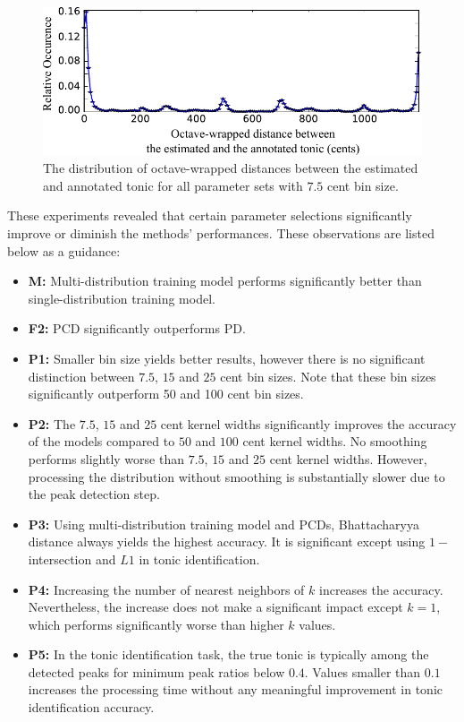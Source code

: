 \documentclass{sig-alternate}
\begin{document}
\begin{figure}
\centering
\includegraphics[width=.8\columnwidth]{figures/tonic_deviation_distribution}
\caption{The distribution of octave-wrapped distances between the estimated and annotated tonic for all parameter sets with $7.5$ cent bin size.}
\label{fig:tonic_distribution}
\end{figure}

These experiments revealed that certain parameter selections significantly improve or diminish the methods' performances. These observations are listed below as a guidance:

\begin{itemize}[noitemsep]
\item \textbf{M:} Multi-distribution training model performs significantly better than single-distribution training model.
\item \textbf{F2:} PCD significantly outperforms PD.
\item \textbf{P1:} Smaller bin size yields better results, however there is no significant distinction between $7.5$, $15$ and $25$ cent bin sizes. Note that these bin sizes significantly outperform 50 and 100 cent bin sizes.
\item \textbf{P2:} The $7.5$, $15$ and $25$ cent kernel widths significantly improves the accuracy of the models compared to $50$ and $100$ cent kernel widths. No smoothing performs slightly worse than $7.5$, $15$ and $25$ cent kernel widths. However, processing the distribution without smoothing is substantially slower due to the peak detection step.
\item \textbf{P3:} Using multi-distribution training model and PCDs, Bhattacharyya distance always yields the highest accuracy. It is significant except using $1-$intersection and $L1$ in tonic identification.
\item \textbf{P4:} Increasing the number of nearest neighbors of $k$ increases the accuracy. Nevertheless, the increase does not make a significant impact except $k = 1$, which performs significantly worse than higher $k$ values.
\item \textbf{P5:} In the tonic identification task, the true tonic is typically among the detected peaks for minimum peak ratios below $0.4$. Values smaller than $0.1$ increases the processing time without any meaningful improvement in tonic identification accuracy.
\end{itemize}
\end{document}
